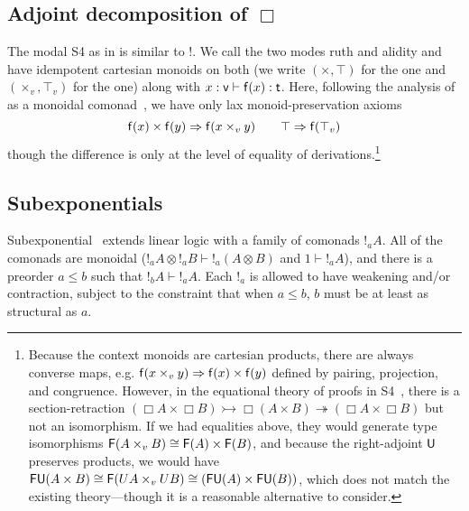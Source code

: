 
\subsection{Adjoint decomposition of $\Box$}  

The modal S4 \Bx{}{} as in \citet{pfenningdavies} is similar to !.  We
call the two modes ruth and alidity and have idempotent
cartesian monoids on both (we write $(\times,\top)$ for the  one
and $(\times_v,\top_v)$ for the  one) along with $x : \mathsf{v}
\vdash \mathsf{f}(x) : \mathsf{t}$.  Here, following the analysis of \Bx{}{}
as a monoidal comonad~\citep{alechina+01categoricals4}, we have only lax
monoid-preservation axioms
\[
\mathsf{f}(x) \times \mathsf{f}(y) \Rightarrow \mathsf{f}(x \times_v y) \\
\qquad
\top \Rightarrow \mathsf{f}(\top_v)
\]
though the difference is only at the level of equality of
derivations.\footnote{Because the context monoids are cartesian
  products, there are always converse maps, e.g.  $\mathsf{f}(x \times_v y)
  \Rightarrow \mathsf{f}(x) \times \mathsf{f}(y)$ defined by pairing, projection, and
  congruence.  However, in the equational theory of proofs in
  S4~\citep{pfenningdavies}, there is a section-retraction $(\Box A
  \times \Box B) \rightarrowtail \Box (A \times B) \twoheadrightarrow
  (\Box A \times \Box B)$ but not an isomorphism. If we had equalities
  above, they would generate type isomorphisms $\mathsf{F}(A \times_v B)
  \cong \mathsf{F}(A) \times \mathsf{F}(B)$, and because the right-adjoint
  $\mathsf{U}$ preserves products, we would have $\mathsf{F} \mathsf{U} (A \times
  B) \cong \mathsf{F}(U A \times_v U B) \cong (\mathsf{FU}(A) \times
  \mathsf{FU}(B))$, which does not match the existing theory---though it is
  a reasonable alternative to consider.
}

\subsection{Subexponentials}

Subexponential~\citep{danos,nigam} extends linear logic with a family of
comonads $!_a A$.  All of the comonads are monoidal ($!_a A \otimes !_a
B \vdash !_a(A \otimes B)$ and $1 \vdash !_a A$), and there is a
preorder $a \le b$ such that $!_b A \vdash !_a A$.  Each $!_a$ is
allowed to have weakening and/or contraction, subject to the constraint
that when $a \le b$, $b$ must be at least as structural as $a$.

